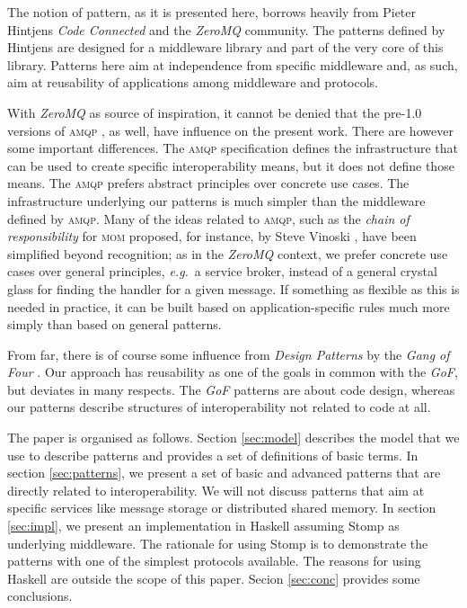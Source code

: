 \documentclass[a4paper]{scrartcl}
\newcommand\eg{\textit{e.g.}}
\newcommand{\acronym}[1]{\textsc{#1}}
\newcommand{\term}[1]{\emph{#1}}
\begin{document}
The notion of pattern, as it is presented here,
borrows heavily from Pieter Hintjens \term{Code Connected} \cite{cc13}
and the \term{ZeroMQ} community.
The patterns defined by Hintjens are designed for 
a middleware library and part of the very core of this library.
Patterns here aim at independence from specific middleware
and, as such, aim at reusability of applications
among middleware and protocols.

With \term{ZeroMQ} as source of inspiration,
it cannot be denied that
the pre-1.0 versions of \acronym{amqp} \cite{amqp09}, as well,
have influence on the present work.
There are however some important differences.
The \acronym{amqp} specification defines
the infrastructure that can be used to 
create specific interoperability means,
but it does not define those means.
The \acronym{amqp} prefers abstract principles over
concrete use cases.
The infrastructure underlying our patterns 
is much simpler than the middleware defined by \acronym{amqp}.
Many of the ideas related to \acronym{amqp},
such as the \term{chain of responsibility} for \acronym{mom}
proposed, for instance, by Steve Vinoski \cite{vino02,i3emqp},
have been simplified beyond recognition;
as in the \term{ZeroMQ} context,
we prefer concrete use cases over general principles,
\eg\ a service broker, instead of a general
crystal glass for finding the handler
for a given message.
If something as flexible as this is needed in practice,
it can be built based on application-specific rules
much more simply than based on general patterns.

From far, there is of course some influence
from \term{Design Patterns} by the \term{Gang of Four} \cite{gof}.
Our approach has reusability as one of the goals in common
with the \term{GoF}, but deviates in many respects.
The \term{GoF} patterns are about code design,
whereas our patterns describe structures 
of interoperability not related to code at all.

The paper is organised as follows.
Section \ref{sec:model} describes the model
that we use to describe patterns and 
provides a set of definitions of basic terms.
In section \ref{sec:patterns}, we present
a set of basic and advanced patterns
that are directly related to interoperability.
We will not discuss patterns that aim at 
specific services like message storage or distributed shared memory.
In section \ref{sec:impl}, we present
an implementation in Haskell assuming Stomp
as underlying middleware.
The rationale for using Stomp is to demonstrate the patterns
with one of the simplest protocols available.
The reasons for using Haskell are outside the scope of this paper.
Secion \ref{sec:conc} provides some conclusions.
\end{document}
